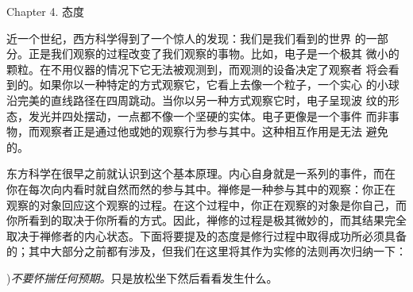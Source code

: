 


\beginchapter Chapter 4. 态度


{
\parindent=3pc
\noindent\hang{}
\1%
{近一个世纪}，西方科学得到了一个惊人的发现：我们是我们看到的世界
的一部分。正是我们观察的过程改变了我们观察的事物。比如，电子是一个极其
微小的颗粒。在不用仪器的情况下它无法被观测到，而观测的设备决定了观察者
将会看到的。如果你以一种特定的方式观察它，它看上去像一个粒子，一个实心
的小球沿完美的直线路径在四周跳动。当你以另一种方式观察它时，电子呈现波
纹的形态，发光并四处摆动，一点都不像一个坚硬的实体。电子更像是一个事件
而非事物，而观察者正是通过他或她的观察行为参与其中。这种相互作用是无法
避免的。

}

东方科学在很早之前就认识到这个基本原理。内心自身就是一系列的事件，而在
你在每次向内看时就自然而然的参与其中。禅修是一种参与其中的观察：你正在
观察的对象回应这个观察的过程。在这个过程中，你正在观察的对象是你自己，而
你所看到的取决于你所看的方式。因此，禅修的过程是极其微妙的，而其结果完全
取决于禅修者的内心状态。下面将要提及的态度是修行过程中取得成功所必须具备
的；其中大部分之前都有涉及，但我们在这里将其作为实修的法则再次归纳一下：

\medbreak
{}){\it 不要怀揣任何预期。}只是放松坐下然后看看发生什么。

\endchapter

\byebye
